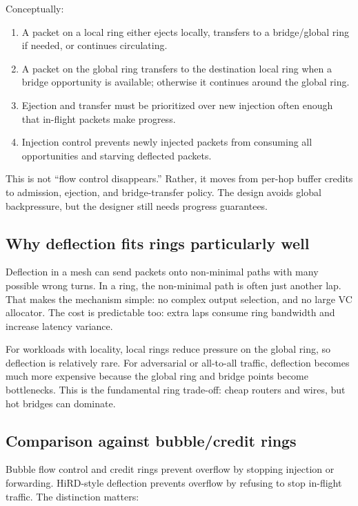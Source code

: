 \documentclass[11pt]{article}
\begin{document}
Conceptually:

\begin{enumerate}
  \item A packet on a local ring either ejects locally, transfers to a bridge/global ring if needed, or continues circulating.
  \item A packet on the global ring transfers to the destination local ring when a bridge opportunity is available; otherwise it continues around the global ring.
  \item Ejection and transfer must be prioritized over new injection often enough that in-flight packets make progress.
  \item Injection control prevents newly injected packets from consuming all opportunities and starving deflected packets.
\end{enumerate}

This is not ``flow control disappears.'' Rather, it moves from per-hop buffer credits to admission, ejection, and bridge-transfer policy. The design avoids global backpressure, but the designer still needs progress guarantees.

\subsection{Why deflection fits rings particularly well}

Deflection in a mesh can send packets onto non-minimal paths with many possible wrong turns. In a ring, the non-minimal path is often just another lap. That makes the mechanism simple: no complex output selection, and no large VC allocator. The cost is predictable too: extra laps consume ring bandwidth and increase latency variance.

For workloads with locality, local rings reduce pressure on the global ring, so deflection is relatively rare. For adversarial or all-to-all traffic, deflection becomes much more expensive because the global ring and bridge points become bottlenecks. This is the fundamental ring trade-off: cheap routers and wires, but hot bridges can dominate.

\subsection{Comparison against bubble/credit rings}

Bubble flow control and credit rings prevent overflow by stopping injection or forwarding. HiRD-style deflection prevents overflow by refusing to stop in-flight traffic. The distinction matters:
\end{document}
